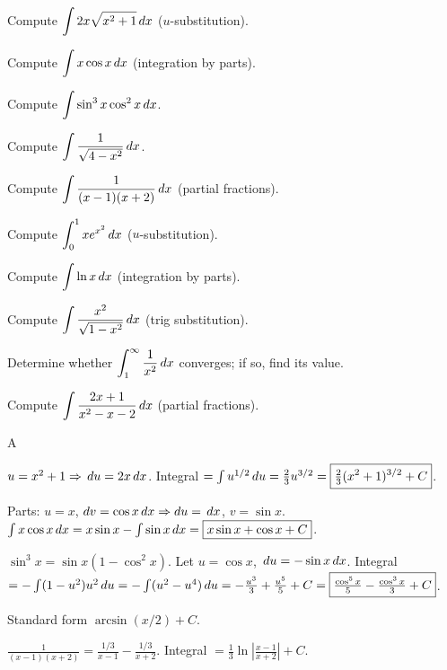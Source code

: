\documentclass[11pt]{article}
\begin{document}
\begin{problems}
\item Compute $\displaystyle \int 2x \sqrt{x^2 + 1} \,dx$ ($u$-substitution).
\item Compute $\displaystyle \int x \cos x \,dx$ (integration by parts).
\item Compute $\displaystyle \int \sin^3 x \cos^2 x \,dx$.
\item Compute $\displaystyle \int \dfrac{1}{\sqrt{4 - x^2}} \,dx$.
\item Compute $\displaystyle \int \dfrac{1}{(x-1)(x+2)} \,dx$ (partial fractions).
\end{problems}

\vfill
\newpage
{}
\begin{problems}
\item Compute $\displaystyle \int_0^1 x e^{x^2} \,dx$ ($u$-substitution).
\item Compute $\displaystyle \int \ln x \,dx$ (integration by parts).
\item Compute $\displaystyle \int \dfrac{x^2}{\sqrt{1 - x^2}} \,dx$ (trig substitution).
\item Determine whether $\displaystyle \int_1^\infty \dfrac{1}{x^2} \,dx$ converges; if so, find its value.
\item Compute $\displaystyle \int \dfrac{2x + 1}{x^2 - x - 2} \,dx$ (partial fractions).
\end{problems}

\vfill
\newpage
{}

\begin{answers}{A}
\item $u = x^2 + 1 \Rightarrow \,du = 2x \,dx$. Integral $= \int u^{1/2} \,du = \tfrac{2}{3} u^{3/2} = \boxed{\tfrac{2}{3}(x^2+1)^{3/2} + C}$.
\item Parts: $u = x$, $dv = \cos x \,dx \Rightarrow du = \,dx$, $v = \sin x$. $\int x \cos x \,dx = x \sin x - \int \sin x \,dx = \boxed{x \sin x + \cos x + C}$.
\item $\sin^3 x = \sin x(1 - \cos^2 x)$. Let $u = \cos x$, $\,du = -\sin x \,dx$. Integral $= -\int (1 - u^2) u^2 \,du = -\int (u^2 - u^4) \,du = -\tfrac{u^3}{3} + \tfrac{u^5}{5} + C = \boxed{\tfrac{\cos^5 x}{5} - \tfrac{\cos^3 x}{3} + C}$.
\item Standard form $\boxed{\arcsin(x/2) + C}$.
\item $\tfrac{1}{(x-1)(x+2)} = \tfrac{1/3}{x-1} - \tfrac{1/3}{x+2}$. Integral $= \boxed{\tfrac{1}{3} \ln\!\left|\tfrac{x-1}{x+2}\right| + C}$.
\end{answers}
\end{document}
